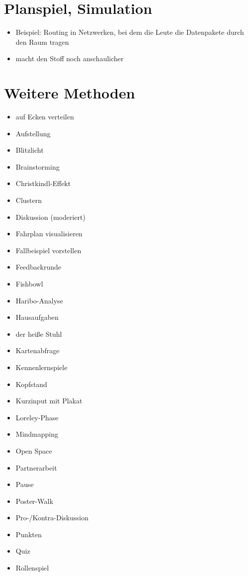 \section{Planspiel, Simulation}
\begin{itemize}
 \item Beispiel: Routing in Netzwerken, bei dem die Leute die Datenpakete durch den Raum tragen
 \item macht den Stoff noch anschaulicher
\end{itemize}

\section{Weitere Methoden}

\twocolumn
\begin{itemize}
  \item auf Ecken verteilen
  \item Aufstellung
  \item Blitzlicht
  \item Brainstorming
  \item Christkindl-Effekt
  \item Clustern
  \item Diskussion (moderiert)
  \item Fahrplan visualisieren
  \item Fallbeispiel vorstellen
  \item Feedbackrunde
  \item Fishbowl
  \item Haribo-Analyse
  \item Hausaufgaben
  \item der heiße Stuhl
  \item Kartenabfrage
  \item Kennenlernspiele
  \item Kopfstand
  \item Kurzinput mit Plakat
  \item Loreley-Phase
  \item Mindmapping
  \item Open Space
  \item Partnerarbeit
  \item Pause
  \item Poster-Walk
  \item Pro-/Kontra-Diskussion
  \item Punkten
  \item Quiz
  \item Rollenspiel

\end{itemize}
